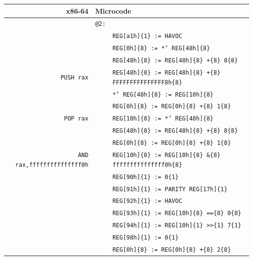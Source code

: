 \documentclass[10pt,twocolumn]{article}
\begin{document}
\begin{table}[!h]
\begin{center}
\begin{tabular}{r|rl}
\textbf{x86-64} & \multicolumn{2}{l}{\textbf{Microcode}}
\\ \hline

& \texttt{@2:} \\ & %
& \texttt{REG[a1h]\{1\} := HAVOC} \\ & %
& \texttt{REG[0h]\{8\} := *' REG[48h]\{8\}} \\ & %
& \texttt{REG[48h]\{8\} := REG[48h]\{8\} +\{8\} 8\{8\}} \\ \hline

\texttt{PUSH rax} & %
& \texttt{REG[48h]\{8\} := REG[48h]\{8\} +\{8\} FFFFFFFFFFFFFFF8h\{8\}} \\ & %
& \texttt{*' REG[48h]\{8\} := REG[10h]\{8\}} \\ & %
& \texttt{REG[0h]\{8\} := REG[0h]\{8\} +\{8\} 1\{8\}} \\ \hline

\texttt{POP rax} & %
& \texttt{REG[10h]\{8\} := *' REG[48h]\{8\}} \\ & %
& \texttt{REG[48h]\{8\} := REG[48h]\{8\} +\{8\} 8\{8\}} \\ & %
& \texttt{REG[0h]\{8\} := REG[0h]\{8\} +\{8\} 1\{8\}} \\ \hline


\texttt{AND rax,fffffffffffffff0h} & %
& \texttt{REG[10h]\{8\} := REG[10h]\{8\} \&\{8\} fffffffffffffff0h\{8\}} \\ & %

& \texttt{REG[90h]\{1\} := 0\{1\}} \\ & %
& \texttt{REG[91h]\{1\} := PARITY REG[17h]\{1\}} \\ & %
& \texttt{REG[92h]\{1\} := HAVOC} \\ & %
& \texttt{REG[93h]\{1\} := REG[10h]\{8\} ==\{8\} 0\{8\}} \\ & %
& \texttt{REG[94h]\{1\} := REG[10h]\{1\} >>\{1\} 7\{1\}} \\ & %
& \texttt{REG[98h]\{1\} := 0\{1\}} \\ & %
& \texttt{REG[0h]\{8\} := REG[0h]\{8\} +\{8\} 2\{8\}} \\ \hline



\end{tabular}
\end{center}
\end{table}
\end{document}

